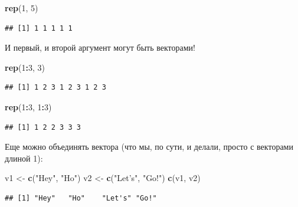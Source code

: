 \documentclass[]{book}
\newenvironment{Shaded}{\begin{snugshade}}{\end{snugshade}}
\newcommand{\KeywordTok}[1]{\textcolor[rgb]{0.13,0.29,0.53}{\textbf{#1}}}
\newcommand{\DecValTok}[1]{\textcolor[rgb]{0.00,0.00,0.81}{#1}}
\newcommand{\StringTok}[1]{\textcolor[rgb]{0.31,0.60,0.02}{#1}}
\newcommand{\OperatorTok}[1]{\textcolor[rgb]{0.81,0.36,0.00}{\textbf{#1}}}
\newcommand{\NormalTok}[1]{#1}
\begin{document}
\begin{Shaded}
\begin{Highlighting}[]
\KeywordTok{rep}\NormalTok{(}\DecValTok{1}\NormalTok{, }\DecValTok{5}\NormalTok{)}
\end{Highlighting}
\end{Shaded}

\begin{verbatim}
## [1] 1 1 1 1 1
\end{verbatim}

И первый, и второй аргумент могут быть векторами!

\begin{Shaded}
\begin{Highlighting}[]
\KeywordTok{rep}\NormalTok{(}\DecValTok{1}\OperatorTok{:}\DecValTok{3}\NormalTok{, }\DecValTok{3}\NormalTok{)}
\end{Highlighting}
\end{Shaded}

\begin{verbatim}
## [1] 1 2 3 1 2 3 1 2 3
\end{verbatim}

\begin{Shaded}
\begin{Highlighting}[]
\KeywordTok{rep}\NormalTok{(}\DecValTok{1}\OperatorTok{:}\DecValTok{3}\NormalTok{, }\DecValTok{1}\OperatorTok{:}\DecValTok{3}\NormalTok{)}
\end{Highlighting}
\end{Shaded}

\begin{verbatim}
## [1] 1 2 2 3 3 3
\end{verbatim}

Еще можно объединять вектора (что мы, по сути, и делали, просто с
векторами длиной 1):

\begin{Shaded}
\begin{Highlighting}[]
\NormalTok{v1 <-}\StringTok{ }\KeywordTok{c}\NormalTok{(}\StringTok{"Hey"}\NormalTok{, }\StringTok{"Ho"}\NormalTok{)}
\NormalTok{v2 <-}\StringTok{ }\KeywordTok{c}\NormalTok{(}\StringTok{"Let's"}\NormalTok{, }\StringTok{"Go!"}\NormalTok{)}
\KeywordTok{c}\NormalTok{(v1, v2)}
\end{Highlighting}
\end{Shaded}

\begin{verbatim}
## [1] "Hey"   "Ho"    "Let's" "Go!"
\end{verbatim}
\end{document}
